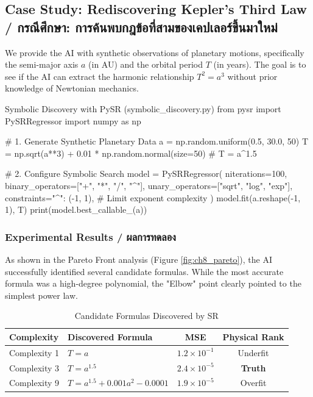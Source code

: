 \subsection{Case Study: Rediscovering Kepler's Third Law \quad / \quad \textthai{กรณีศึกษา: การค้นพบกฎข้อที่สามของเคปเลอร์ขึ้นมาใหม่}}
We provide the AI with synthetic observations of planetary motions, specifically the semi-major axis $a$ (in AU) and the orbital period $T$ (in years). The goal is to see if the AI can extract the harmonic relationship $T^2 = a^3$ without prior knowledge of Newtonian mechanics.

\begin{pythonbox}{Symbolic Discovery with PySR (symbolic\_discovery.py)}
from pysr import PySRRegressor
import numpy as np

# 1. Generate Synthetic Planetary Data
a = np.random.uniform(0.5, 30.0, 50) 
T = np.sqrt(a**3) + 0.01 * np.random.normal(size=50) # T = a^1.5

# 2. Configure Symbolic Search
model = PySRRegressor(
    niterations=100,
    binary_operators=["+", "*", "/", "^"],
    unary_operators=["sqrt", "log", "exp"],
    constraints={"^": (-1, 1)}, # Limit exponent complexity
)
model.fit(a.reshape(-1, 1), T)
print(model.best_callable_(a))
\end{pythonbox}

\subsubsection*{Experimental Results \quad / \quad \textthai{ผลการทดลอง}}
As shown in the Pareto Front analysis (Figure \ref{fig:ch8_pareto}), the AI successfully identified several candidate formulas. While the most accurate formula was a high-degree polynomial, the "Elbow" point clearly pointed to the simplest power law.

\begin{table}[ht]
\centering
\caption{Candidate Formulas Discovered by SR}
\begin{tabular}{llcc}
\toprule
Complexity & Discovered Formula & MSE & Physical Rank \\
\midrule
Complexity 1 & $T = a$ & $1.2 \times 10^{-1}$ & Underfit \\
Complexity 3 & $T = a^{1.5}$ & $2.4 \times 10^{-5}$ & \textbf{Truth} \\
Complexity 9 & $T = a^{1.5} + 0.001a^2 - 0.0001$ & $1.9 \times 10^{-5}$ & Overfit \\
\bottomrule
\end{tabular}
\end{table}

